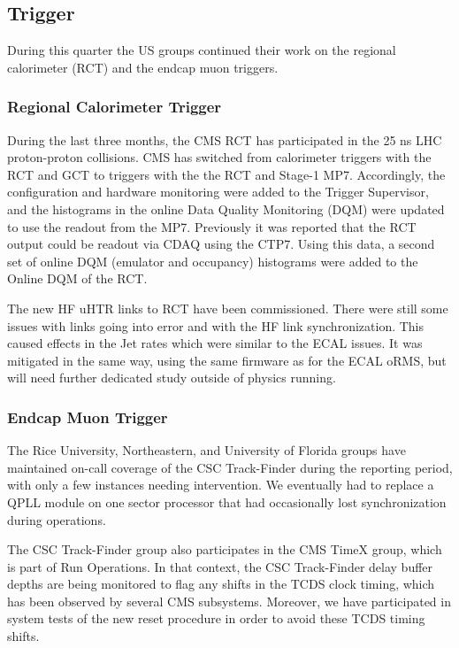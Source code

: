 \subsection{Trigger}
During this quarter the US groups continued their work on the regional calorimeter (RCT) and the endcap muon triggers.  
\subsubsection{Regional Calorimeter Trigger}
During the last three months, the CMS RCT has participated in the 25 ns LHC proton-proton collisions. CMS has switched from calorimeter triggers with the RCT and GCT to triggers with the the RCT and Stage-1 MP7.  Accordingly, the configuration and hardware monitoring were added to the Trigger Supervisor, and the histograms in the online Data Quality Monitoring (DQM) were updated to use the readout from the MP7.  Previously it was reported that the RCT output could be readout via CDAQ using the CTP7. Using this data, a second set of online DQM (emulator and occupancy) histograms were added to the Online DQM of the RCT.

The new HF uHTR links to RCT have been commissioned.  There were still some issues with links going into error and with the HF link synchronization.  This caused effects in the Jet rates which were similar to the ECAL issues. It was mitigated in the same way, using the same firmware as for the ECAL oRMS, but will need further dedicated study outside of physics running.  

\subsubsection{Endcap Muon Trigger}
The Rice University, Northeastern, and University of Florida groups have maintained on-call coverage of the CSC Track-Finder during the reporting period, with only a few instances needing intervention. We eventually had to replace a QPLL module on one sector processor that had occasionally lost synchronization during operations.

The CSC Track-Finder group also participates in the CMS TimeX group, which is part of Run Operations. In that context, the CSC Track-Finder delay buffer depths are being monitored to flag any shifts in the TCDS clock timing, which has been observed by several CMS subsystems. Moreover, we have participated in system tests of the new reset procedure in order to avoid these TCDS timing shifts. 

